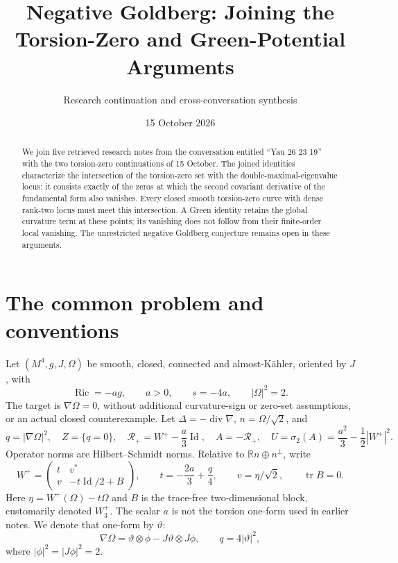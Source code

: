 \documentclass[11pt]{article}
\title{Negative Goldberg: Joining the Torsion-Zero and Green-Potential Arguments}
\author{Research continuation and cross-conversation synthesis}
\date{15 October 2026}
\newcommand{\Ric}{\operatorname{Ric}}
\newcommand{\tr}{\operatorname{tr}}
\newcommand{\Id}{\operatorname{Id}}
\newcommand{\RR}{\mathcal R_+}
\begin{document}
\maketitle
\begin{abstract}
We join five retrieved research notes from the conversation entitled
``Yau 26 23 19'' with the two torsion-zero continuations of 15 October.
The joined identities characterize the intersection of the torsion-zero
set with the double-maximal-eigenvalue locus: it consists exactly of the
zeros at which the second covariant derivative of the fundamental form
also vanishes. Every closed smooth torsion-zero curve with dense rank-two
locus must meet this intersection. A Green identity retains the global
curvature term at these points; its vanishing does not follow from their
finite-order local vanishing. The unrestricted negative Goldberg
conjecture remains open in these arguments.
\end{abstract}

\section{The common problem and conventions}
Let $(M^4,g,J,\Omega)$ be smooth, closed, connected and almost-K\"ahler,
oriented by $J$, with
\[
\Ric=-ag,\qquad a>0,\qquad s=-4a,\qquad |\Omega|^2=2.
\]
The target is $\nabla\Omega=0$, without additional curvature-sign or
zero-set assumptions, or an actual closed counterexample.
Let $\Delta=-\operatorname{div}\nabla$, $n=\Omega/\sqrt2$, and
\[
q=|\nabla\Omega|^2,\quad Z=\{q=0\},\quad
\RR=W^+-\frac a3\Id,\quad A=-\RR,\quad
U=\sigma_2(A)=\frac{a^2}{3}-\frac12|W^+|^2.
\]
Operator norms are Hilbert--Schmidt norms. Relative to
$\mathbb R n\oplus n^\perp$, write
\[
W^+=\begin{pmatrix}t&v^*\\v&-t\Id/2+B\end{pmatrix},\qquad
t=-\frac{2a}{3}+\frac q4,\qquad v=\eta/\sqrt2,\qquad\tr B=0.
\]
Here $\eta=W^+(\Omega)-t\Omega$ and $B$ is the trace-free two-dimensional
block, customarily denoted $W_3^+$. The scalar $a$ is not the torsion
one-form used in earlier notes. We denote that one-form by $\vartheta$:
\[
\nabla\Omega=\vartheta\otimes\phi-J\vartheta\otimes J\phi,
\qquad q=4|\vartheta|^2,
\]
where $|\phi|^2=|J\phi|^2=2$.
\end{document}
